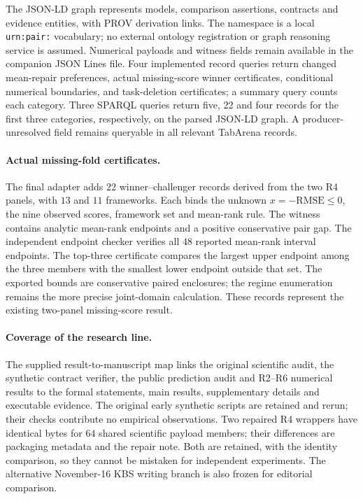 The JSON-LD graph represents models, comparison assertions, contracts and evidence entities, with PROV derivation links. The namespace is a local \texttt{urn:pair:} vocabulary; no external ontology registration or graph reasoning service is assumed. Numerical payloads and witness fields remain available in the companion JSON Lines file. Four implemented record queries return changed mean-repair preferences, actual missing-score winner certificates, conditional numerical boundaries, and task-deletion certificates; a summary query counts each category. Three SPARQL queries return five, 22 and four records for the first three categories, respectively, on the parsed JSON-LD graph. A producer-unresolved field remains queryable in all relevant TabArena records.


\paragraph{Actual missing-fold certificates.}
The final adapter adds $22$ winner--challenger records derived from the two R4 panels, with $13$ and $11$ frameworks. Each binds the unknown $x=-\mathrm{RMSE}\le0$, the nine observed scores, framework set and mean-rank rule. The witness contains analytic mean-rank endpoints and a positive conservative pair gap. The independent endpoint checker verifies all $48$ reported mean-rank interval endpoints. The top-three certificate compares the largest upper endpoint among the three members with the smallest lower endpoint outside that set. The exported bounds are conservative paired enclosures; the regime enumeration remains the more precise joint-domain calculation. These records represent the existing two-panel missing-score result.

\paragraph{Coverage of the research line.}
The supplied result-to-manuscript map links the original scientific audit, the synthetic contract verifier, the public prediction audit and R2--R6 numerical results to the formal statements, main results, supplementary details and executable evidence. The original early synthetic scripts are retained and rerun; their checks contribute no empirical observations. Two repaired R4 wrappers have identical bytes for $64$ shared scientific payload members; their differences are packaging metadata and the repair note. Both are retained, with the identity comparison, so they cannot be mistaken for independent experiments. The alternative November-16 KBS writing branch is also frozen for editorial comparison.

